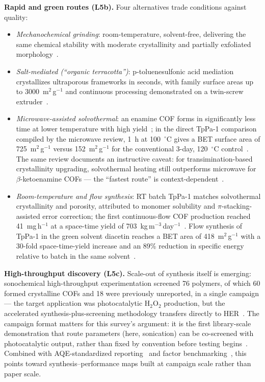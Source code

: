 \textbf{Rapid and green routes (L5b).} Four alternatives trade conditions against quality:
\begin{itemize}
\item \emph{Mechanochemical grinding}: room-temperature, solvent-free, delivering the same
  chemical stability with moderate crystallinity and partially exfoliated
  morphology~\cite{biswal2013mechanochemical}.
\item \emph{Salt-mediated (``organic terracotta'')}: p-toluenesulfonic acid mediation
  crystallizes ultraporous frameworks in seconds, with family surface areas up to
  3000~m$^2$\,g$^{-1}$ and continuous processing demonstrated on a twin-screw
  extruder~\cite{karak2017constructing}.
\item \emph{Microwave-assisted solvothermal}: an enamine COF forms in significantly less time
  at lower temperature with high yield~\cite{wei2015the}; in the direct TpPa-1 comparison
  compiled by the microwave review, 1~h at 100~$^\circ$C gives a BET surface area of
  725~m$^2$\,g$^{-1}$ versus 152~m$^2$\,g$^{-1}$ for the conventional 3-day, 120~$^\circ$C
  control~\cite{grenu2020microwave}. The same review documents an instructive caveat: for
  transimination-based crystallinity upgrading, solvothermal heating still outperforms
  microwave for $\beta$-ketoenamine COFs --- the ``fastest route'' is
  context-dependent~\cite{grenu2020microwave}.
\item \emph{Room-temperature and flow synthesis}: RT batch TpPa-1 matches solvothermal
  crystallinity and porosity, attributed to monomer solubility and $\pi$-stacking-assisted
  error correction; the first continuous-flow COF production reached 41~mg\,h$^{-1}$ at a
  space-time yield of 703~kg\,m$^{-3}$\,day$^{-1}$~\cite{peng2016room}. Flow synthesis of
  TpPa-1 in the green solvent diacetin reaches a BET area of 418~m$^2$\,g$^{-1}$ with a
  30-fold space-time-yield increase and an 89\% reduction in specific energy relative to batch
  in the same solvent~\cite{xu2026structural}.
\end{itemize}

\textbf{High-throughput discovery (L5c).} Scale-out of synthesis itself is emerging:
sonochemical high-throughput experimentation screened 76 polymers, of which 60 formed
crystalline COFs and 18 were previously unreported, in a single campaign --- the target
application was photocatalytic H$_2$O$_2$ production, but the accelerated
synthesis-plus-screening methodology transfers directly to HER~\cite{zhao2022accelerated}.
The campaign format matters for this survey's argument: it is the first library-scale
demonstration that route parameters (here, sonication) can be co-screened with photocatalytic
output, rather than fixed by convention before testing begins~\cite{zhao2022accelerated}.
Combined with AQE-standardized reporting~\cite{li2022covalent} and factor
benchmarking~\cite{ghosh2020identification}, this points toward synthesis--performance maps
built at campaign scale rather than paper scale.

